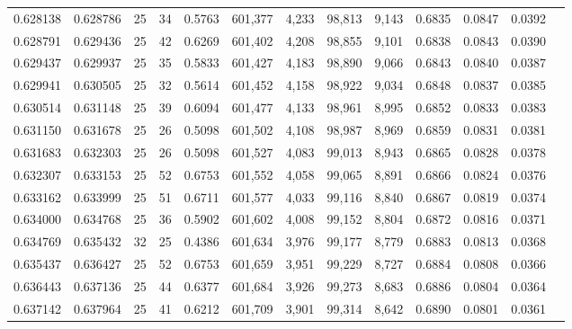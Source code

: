 \begin{tabular}{rrrrrrrrrrrrr}
0.628138 & 0.628786 &    25 &  34 &                                     0.5763 & 601,377 &   4,233 &  98,813 &   9,143 & 0.6835 & 0.0847 & 0.0392 \\
0.628791 & 0.629436 &    25 &  42 &                                     0.6269 & 601,402 &   4,208 &  98,855 &   9,101 & 0.6838 & 0.0843 & 0.0390 \\
0.629437 & 0.629937 &    25 &  35 &                                     0.5833 & 601,427 &   4,183 &  98,890 &   9,066 & 0.6843 & 0.0840 & 0.0387 \\
0.629941 & 0.630505 &    25 &  32 &                                     0.5614 & 601,452 &   4,158 &  98,922 &   9,034 & 0.6848 & 0.0837 & 0.0385 \\
0.630514 & 0.631148 &    25 &  39 &                                     0.6094 & 601,477 &   4,133 &  98,961 &   8,995 & 0.6852 & 0.0833 & 0.0383 \\
0.631150 & 0.631678 &    25 &  26 &                                     0.5098 & 601,502 &   4,108 &  98,987 &   8,969 & 0.6859 & 0.0831 & 0.0381 \\
0.631683 & 0.632303 &    25 &  26 &                                     0.5098 & 601,527 &   4,083 &  99,013 &   8,943 & 0.6865 & 0.0828 & 0.0378 \\
0.632307 & 0.633153 &    25 &  52 &                                     0.6753 & 601,552 &   4,058 &  99,065 &   8,891 & 0.6866 & 0.0824 & 0.0376 \\
0.633162 & 0.633999 &    25 &  51 &                                     0.6711 & 601,577 &   4,033 &  99,116 &   8,840 & 0.6867 & 0.0819 & 0.0374 \\
0.634000 & 0.634768 &    25 &  36 &                                     0.5902 & 601,602 &   4,008 &  99,152 &   8,804 & 0.6872 & 0.0816 & 0.0371 \\
0.634769 & 0.635432 &    32 &  25 &                                     0.4386 & 601,634 &   3,976 &  99,177 &   8,779 & 0.6883 & 0.0813 & 0.0368 \\
0.635437 & 0.636427 &    25 &  52 &                                     0.6753 & 601,659 &   3,951 &  99,229 &   8,727 & 0.6884 & 0.0808 & 0.0366 \\
0.636443 & 0.637136 &    25 &  44 &                                     0.6377 & 601,684 &   3,926 &  99,273 &   8,683 & 0.6886 & 0.0804 & 0.0364 \\
0.637142 & 0.637964 &    25 &  41 &                                     0.6212 & 601,709 &   3,901 &  99,314 &   8,642 & 0.6890 & 0.0801 & 0.0361 \\

\end{tabular}
